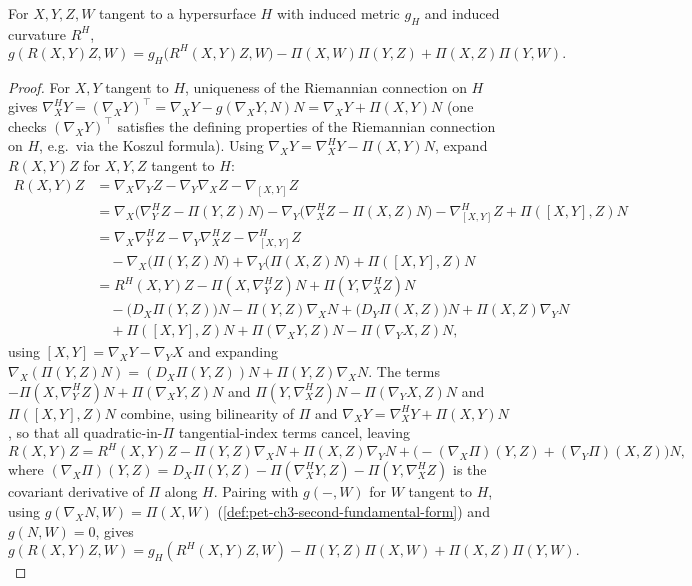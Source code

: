 \begin{theorem}
  \label{thm:pet-ch3-tangential-curvature-equation}
  \leanok
  For $X,Y,Z,W$ tangent to a hypersurface $H$ with induced metric $g_H$ and
  induced curvature $R^H$,
  \[
    g(R(X,Y)Z,W)=g_H\big(R^H(X,Y)Z,W\big)-\Pi(X,W)\Pi(Y,Z)+\Pi(X,Z)\Pi(Y,W).
  \]
\end{theorem}
\begin{proof}
  For $X,Y$ tangent to $H$, uniqueness of the Riemannian connection on $H$ gives
  $\nabla^H_XY=(\nabla_XY)^\top=\nabla_XY-g(\nabla_XY,N)N=\nabla_XY+\Pi(X,Y)N$
  (one checks $(\nabla_XY)^\top$ satisfies the defining properties of the
  Riemannian connection on $H$, e.g.\ via the Koszul formula). Using
  $\nabla_XY=\nabla^H_XY-\Pi(X,Y)N$, expand $R(X,Y)Z$ for $X,Y,Z$ tangent to $H$:
  \begin{align*}
    R(X,Y)Z&=\nabla_X\nabla_YZ-\nabla_Y\nabla_XZ-\nabla_{[X,Y]}Z\\
    &=\nabla_X\big(\nabla^H_YZ-\Pi(Y,Z)N\big)-\nabla_Y\big(\nabla^H_XZ-\Pi(X,Z)N\big)
      -\nabla^H_{[X,Y]}Z+\Pi([X,Y],Z)N\\
    &=\nabla_X\nabla^H_YZ-\nabla_Y\nabla^H_XZ-\nabla^H_{[X,Y]}Z\\
    &\quad-\nabla_X\big(\Pi(Y,Z)N\big)+\nabla_Y\big(\Pi(X,Z)N\big)+\Pi([X,Y],Z)N\\
    &=R^H(X,Y)Z-\Pi(X,\nabla^H_YZ)N+\Pi(Y,\nabla^H_XZ)N\\
    &\quad-\big(D_X\Pi(Y,Z)\big)N-\Pi(Y,Z)\nabla_XN+\big(D_Y\Pi(X,Z)\big)N+\Pi(X,Z)\nabla_YN\\
    &\quad+\Pi([X,Y],Z)N+\Pi(\nabla_XY,Z)N-\Pi(\nabla_YX,Z)N,
  \end{align*}
  using $[X,Y]=\nabla_XY-\nabla_YX$ and expanding
  $\nabla_X(\Pi(Y,Z)N)=(D_X\Pi(Y,Z))N+\Pi(Y,Z)\nabla_XN$. The terms
  $-\Pi(X,\nabla^H_YZ)N+\Pi(\nabla_XY,Z)N$ and
  $\Pi(Y,\nabla^H_XZ)N-\Pi(\nabla_YX,Z)N$ and $\Pi([X,Y],Z)N$ combine, using
  bilinearity of $\Pi$ and $\nabla_XY=\nabla^H_XY+\Pi(X,Y)N$, so that all
  quadratic-in-$\Pi$ tangential-index terms cancel, leaving
  \[
    R(X,Y)Z=R^H(X,Y)Z-\Pi(Y,Z)\nabla_XN+\Pi(X,Z)\nabla_YN
    +\big(-(\nabla_X\Pi)(Y,Z)+(\nabla_Y\Pi)(X,Z)\big)N,
  \]
  where $(\nabla_X\Pi)(Y,Z)=D_X\Pi(Y,Z)-\Pi(\nabla^H_XY,Z)-\Pi(Y,\nabla^H_XZ)$ is the
  covariant derivative of $\Pi$ along $H$. Pairing with $g(-,W)$ for $W$ tangent
  to $H$, using $g(\nabla_XN,W)=\Pi(X,W)$ (\cref{def:pet-ch3-second-fundamental-form})
  and $g(N,W)=0$, gives
  \[
    g(R(X,Y)Z,W)=g_H(R^H(X,Y)Z,W)-\Pi(Y,Z)\Pi(X,W)+\Pi(X,Z)\Pi(Y,W).
  \]
\end{proof}

